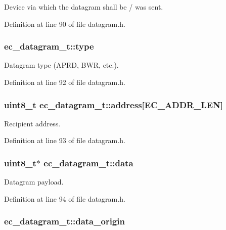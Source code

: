 Device via which the datagram shall be / was sent. 



Definition at line 90 of file datagram.\-h.

\subsubsection[{type}]{ ec\-\_\-datagram\-\_\-t\-::type}\label{structec__datagram__t_a5c19753e2f2a239f3496cde3f9c1ee53}


Datagram type (A\-P\-R\-D, B\-W\-R, etc.). 



Definition at line 92 of file datagram.\-h.

\subsubsection[{address}]{\setlength{\rightskip}{0pt plus 5cm}uint8\-\_\-t ec\-\_\-datagram\-\_\-t\-::address[{\bf E\-C\-\_\-\-A\-D\-D\-R\-\_\-\-L\-E\-N}]}\label{structec__datagram__t_acbe5cfc2b01e0ec6cb720b3dc99c4027}


Recipient address. 



Definition at line 93 of file datagram.\-h.

\subsubsection[{data}]{\setlength{\rightskip}{0pt plus 5cm}uint8\-\_\-t$\ast$ ec\-\_\-datagram\-\_\-t\-::data}\label{structec__datagram__t_ae7471d08444f2bc780532e9268859296}


Datagram payload. 



Definition at line 94 of file datagram.\-h.

\subsubsection[{data\-\_\-origin}]{ ec\-\_\-datagram\-\_\-t\-::data\-\_\-origin}\label{structec__datagram__t_ae8d52c6dc3ef92d165d9d14cd9c3d593}


